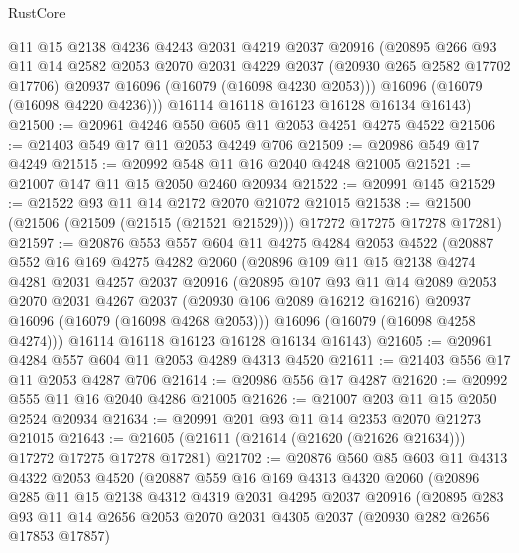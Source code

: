\begin{lexlean}{RustCore}
\begin{coremodule}
        @11
        @15
        @2138
        @4236
        @4243
        @2031
        @4219
        @2037
        @20916
        (@20895
          @266
          @93
          @11
          @14
          @2582
          @2053
          @2070
          @2031
          @4229
          @2037
          (@20930 @265 @2582 @17702 @17706)
          @20937
          @16096
          (@16079 (@16098 @4230 @2053)))
        @16096
        (@16079 (@16098 @4220 @4236)))
      @16114
      @16118
      @16123
      @16128
      @16134
      @16143)
@21500 := @20961 @4246 @550 @605 @11 @2053 @4251 @4275 @4522
@21506 := @21403 @549 @17 @11 @2053 @4249 @706
@21509 := @20986 @549 @17 @4249
@21515 := @20992 @548 @11 @16 @2040 @4248 @21005
@21521 := @21007 @147 @11 @15 @2050 @2460 @20934
@21522 := @20991 @145
@21529 := @21522 @93 @11 @14 @2172 @2070 @21072 @21015
@21538 := @21500 (@21506 (@21509 (@21515 (@21521 @21529))) @17272 @17275 @17278 @17281)
@21597 := @20876
    @553
    @557
    @604
    @11
    @4275
    @4284
    @2053
    @4522
    (@20887
      @552
      @16
      @169
      @4275
      @4282
      @2060
      (@20896
        @109
        @11
        @15
        @2138
        @4274
        @4281
        @2031
        @4257
        @2037
        @20916
        (@20895
          @107
          @93
          @11
          @14
          @2089
          @2053
          @2070
          @2031
          @4267
          @2037
          (@20930 @106 @2089 @16212 @16216)
          @20937
          @16096
          (@16079 (@16098 @4268 @2053)))
        @16096
        (@16079 (@16098 @4258 @4274)))
      @16114
      @16118
      @16123
      @16128
      @16134
      @16143)
@21605 := @20961 @4284 @557 @604 @11 @2053 @4289 @4313 @4520
@21611 := @21403 @556 @17 @11 @2053 @4287 @706
@21614 := @20986 @556 @17 @4287
@21620 := @20992 @555 @11 @16 @2040 @4286 @21005
@21626 := @21007 @203 @11 @15 @2050 @2524 @20934
@21634 := @20991 @201 @93 @11 @14 @2353 @2070 @21273 @21015
@21643 := @21605 (@21611 (@21614 (@21620 (@21626 @21634))) @17272 @17275 @17278 @17281)
@21702 := @20876
    @560
    @85
    @603
    @11
    @4313
    @4322
    @2053
    @4520
    (@20887
      @559
      @16
      @169
      @4313
      @4320
      @2060
      (@20896
        @285
        @11
        @15
        @2138
        @4312
        @4319
        @2031
        @4295
        @2037
        @20916
        (@20895
          @283
          @93
          @11
          @14
          @2656
          @2053
          @2070
          @2031
          @4305
          @2037
          (@20930 @282 @2656 @17853 @17857)

\end{coremodule}
\end{lexlean}
